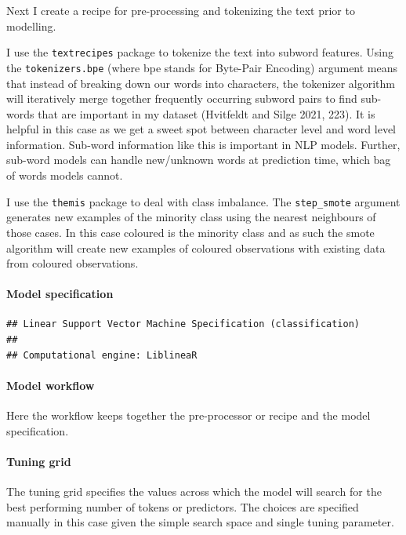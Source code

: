 \documentclass[fleqn,10pt,lineno]{wlpeerj} %
\begin{document}
Next I create a recipe for pre-processing and tokenizing the text prior to modelling.

I use the \texttt{textrecipes} package to tokenize the text into subword features. Using the \texttt{tokenizers.bpe} (where bpe stands for Byte-Pair Encoding) argument means that instead of breaking down our words into characters, the tokenizer algorithm will iteratively merge together frequently occurring subword pairs to find sub-words that are important in my dataset (Hvitfeldt and Silge 2021, 223). It is helpful in this case as we get a sweet spot between character level and word level information. Sub-word information like this is important in NLP models. Further, sub-word models can handle new/unknown words at prediction time, which bag of words models cannot.

I use the \texttt{themis} package to deal with class imbalance. The \texttt{step\_smote} argument generates new examples of the minority class using the nearest neighbours of those cases. In this case coloured is the minority class and as such the smote algorithm will create new examples of coloured observations with existing data from coloured observations.

\hypertarget{model-specification}{%
\paragraph{Model specification}\label{model-specification}}

\begin{verbatim}
## Linear Support Vector Machine Specification (classification)
## 
## Computational engine: LiblineaR
\end{verbatim}

\hypertarget{model-workflow}{%
\paragraph{Model workflow}\label{model-workflow}}

Here the workflow keeps together the pre-processor or recipe and the model specification.

\hypertarget{tuning-grid}{%
\paragraph{Tuning grid}\label{tuning-grid}}

The tuning grid specifies the values across which the model will search for the best performing number of tokens or predictors. The choices are specified manually in this case given the simple search space and single tuning parameter.
\end{document}
